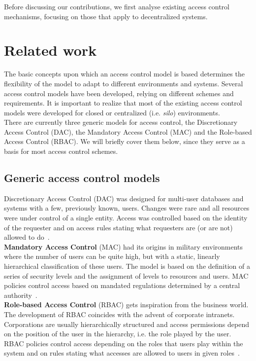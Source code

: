 Before discussing our contributions, we first analyse existing access control mechanisms, focusing on those that apply to decentralized systems.

\section{Related work}
\label{sec:ac_relwork}

The basic concepts upon which an access control model is based determines the flexibility of the model to adapt to different environments and systems. Several access control models have been developed, relying on different schemes and requirements. It is important to realize that most of the existing access control models were developed for closed or centralized (i.e. \textit{silo}) environments.\\

There are currently three generic models for access control, the Discretionary Access Control (DAC), the Mandatory Access Control (MAC) and the Role-based Access Control (RBAC). We will briefly cover them below, since they serve as a basis for most access control schemes.

\subsection{Generic access control models}
Discretionary Access Control (DAC) was designed for multi-user databases and systems with a few, previously known, users. Changes were rare and all resources were under control of a single entity. Access was controlled based on the identity of the requester and on access rules stating what requesters are (or are not) allowed to do~\cite{lampson1974protection}.\\

\textbf{Mandatory Access Control} (MAC) had its origins in military environments where the number of users can be quite high, but with a static, linearly hierarchical classification of these users. The model is based on the definition of a series of security levels and the assignment of levels to resources and users. MAC policies control access based on mandated regulations determined by a central authority~\cite{qian1996mac}.\\

\textbf{Role-based Access Control} (RBAC) gets inspiration from the business world. The development of RBAC coincides with the advent of corporate intranets. Corporations are usually hierarchically structured and access permissions depend on the position of the user in the hierarchy, i.e. the role played by the user. RBAC policies control access depending on the roles that users play within the system and on rules stating what accesses are allowed to users in given roles~\cite{ferraiolo2001proposed}.\\

